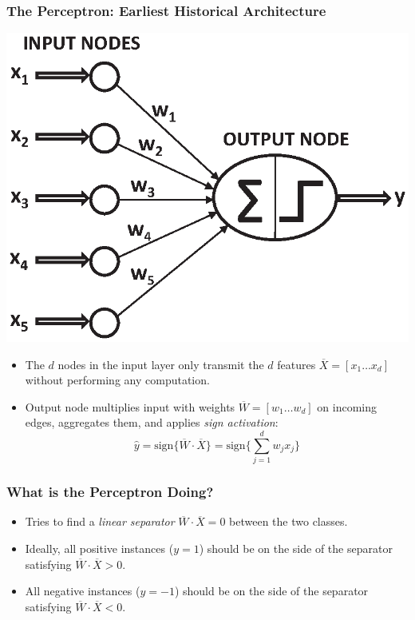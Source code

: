 \documentclass[aspectratio=169,mathserif]{beamer}
\begin{document}
\begin{frame}
\frametitle{The Perceptron: Earliest Historical Architecture}
\begin{center}
\includegraphics[scale=0.4]{neurala.eps}
\end{center}
\begin{itemize}
\item The  $d$ nodes in the input layer only transmit the $d$
features $\overline{X}=[x_1 \ldots x_d]$ without performing any
computation.
\item  Output
node   multiplies input with  weights $\overline{W}=[w_1 \ldots
w_d]$ on incoming edges, aggregates them, and applies  {\em sign
activation}:
\begin{equation*}
\hat{y}= \mbox{sign}\{ \overline{W}\cdot \overline{X} \} =
\mbox{sign}\{ \sum_{j=1}^d w_j x_j \} \label{1nobias}
\end{equation*}
\end{itemize}
\end{frame}



\begin{frame}
\frametitle{What is the Perceptron Doing?}
\begin{itemize}
\item Tries to find a {\em linear separator} $\overline{W}\cdot \overline{X}=0$ between the two
classes. \item  Ideally, all positive instances ($y=1$) should be on
the side of the separator satisfying $\overline{W} \cdot
\overline{X}>0$.
 \item  All negative  instances ($y=-1$) should be on the
side of the separator satisfying $\overline{W} \cdot
\overline{X}<0$.
\end{itemize}
\end{frame}
\end{document}
